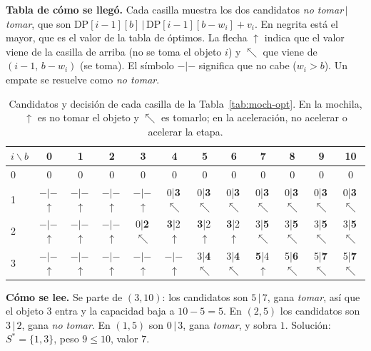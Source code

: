 \documentclass[11pt,a4paper]{article}
\newcommand{\DP}[2]{\mathrm{DP}[#1][#2]}
\theoremstyle{plano}
\begin{document}
\textbf{Tabla de cómo se llegó.} Cada casilla muestra los dos candidatos \textit{no tomar}\,$|$\,\textit{tomar}, que son $\DP{i-1}{b}\,|\,\DP{i-1}{b-w_i}+v_i$. En negrita está el mayor, que es el valor de la tabla de óptimos. La flecha $\uparrow$ indica que el valor viene de la casilla de arriba (no se toma el objeto $i$) y $\nwarrow$ que viene de $(i-1,\,b-w_i)$ (se toma). El símbolo $-|-$ significa que no cabe ($w_i>b$). Un empate se resuelve como \textit{no tomar}.

\begin{table}[h]
\centering\footnotesize
\setlength{\tabcolsep}{1.7pt}
\begin{tabular}{lccccccccccc}
\toprule
$i\backslash b$ & 0 & 1 & 2 & 3 & 4 & 5 & 6 & 7 & 8 & 9 & 10 \\
\midrule
0 & 0 & 0 & 0 & 0 & 0 & 0 & 0 & 0 & 0 & 0 & 0 \\
1 & $-|-$\,$\uparrow$ & $-|-$\,$\uparrow$ & $-|-$\,$\uparrow$ & $-|-$\,$\uparrow$ & 0|\textbf{3}\,$\nwarrow$ & \cellcolor{celda}0|\textbf{3}\,$\nwarrow$ & 0|\textbf{3}\,$\nwarrow$ & 0|\textbf{3}\,$\nwarrow$ & 0|\textbf{3}\,$\nwarrow$ & 0|\textbf{3}\,$\nwarrow$ & 0|\textbf{3}\,$\nwarrow$ \\
2 & $-|-$\,$\uparrow$ & $-|-$\,$\uparrow$ & $-|-$\,$\uparrow$ & 0|\textbf{2}\,$\nwarrow$ & \textbf{3}|2\,$\uparrow$ & \cellcolor{celda}\textbf{3}|2\,$\uparrow$ & \textbf{3}|2\,$\uparrow$ & 3|\textbf{5}\,$\nwarrow$ & 3|\textbf{5}\,$\nwarrow$ & 3|\textbf{5}\,$\nwarrow$ & 3|\textbf{5}\,$\nwarrow$ \\
3 & $-|-$\,$\uparrow$ & $-|-$\,$\uparrow$ & $-|-$\,$\uparrow$ & $-|-$\,$\uparrow$ & $-|-$\,$\uparrow$ & 3|\textbf{4}\,$\nwarrow$ & 3|\textbf{4}\,$\nwarrow$ & \textbf{5}|4\,$\uparrow$ & 5|\textbf{6}\,$\nwarrow$ & 5|\textbf{7}\,$\nwarrow$ & \cellcolor{celda}5|\textbf{7}\,$\nwarrow$ \\
\bottomrule
\end{tabular}
\caption{Candidatos y decisión de cada casilla de la Tabla~\ref{tab:moch-opt}. En la mochila, $\uparrow$ es no tomar el objeto y $\nwarrow$ es tomarlo; en la aceleración, no acelerar o acelerar la etapa.}
\label{tab:moch-como}
\end{table}

\textbf{Cómo se lee.} Se parte de $(3,10)$: los candidatos son $5\,|\,7$, gana \textit{tomar}, así que el objeto 3 entra y la capacidad baja a $10-5=5$. En $(2,5)$ los candidatos son $3\,|\,2$, gana \textit{no tomar}. En $(1,5)$ son $0\,|\,3$, gana \textit{tomar}, y sobra $1$. Solución: $S^*=\{1,3\}$, peso $9\le 10$, valor $7$.
\end{document}
